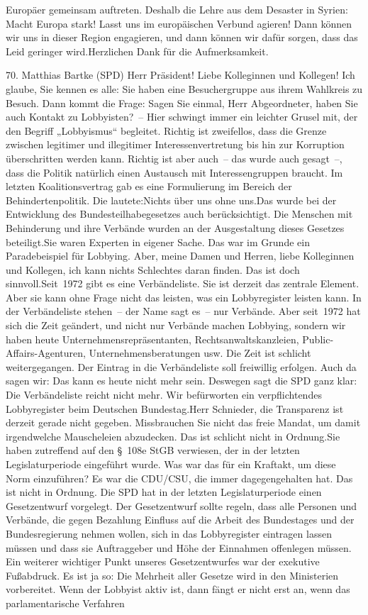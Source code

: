 \documentclass{article}
\begin{document}
Europäer gemeinsam auftreten. Deshalb die Lehre aus dem Desaster in Syrien: Macht Europa stark! Lasst uns im europäischen Verbund agieren! Dann können wir uns in dieser Region engagieren, und dann können wir dafür sorgen, dass das Leid geringer wird.Herzlichen Dank für die Aufmerksamkeit.




	70. Matthias Bartke (SPD) Herr Präsident! Liebe Kolleginnen und Kollegen! Ich glaube, Sie kennen es alle: Sie haben eine Besuchergruppe aus ihrem Wahlkreis zu Besuch. Dann kommt die Frage: Sagen Sie einmal, Herr Abgeordneter, haben Sie auch Kontakt zu Lobbyisten? – Hier schwingt immer ein leichter Grusel mit, der den Begriff „Lobbyismus“ begleitet. Richtig ist zweifellos, dass die Grenze zwischen legitimer und illegitimer Interessenvertretung bis hin zur Korruption überschritten werden kann. Richtig ist aber auch – das wurde auch gesagt –, dass die Politik natürlich einen Austausch mit Interessengruppen braucht. Im letzten Koalitionsvertrag gab es eine Formulierung im Bereich der Behindertenpolitik. Die lautete:Nichts über uns ohne uns.Das wurde bei der Entwicklung des Bundesteilhabegesetzes auch berücksichtigt. Die Menschen mit Behinderung und ihre Verbände wurden an der Ausgestaltung dieses Gesetzes beteiligt.Sie waren Experten in eigener Sache. Das war im Grunde ein Paradebeispiel für Lobbying. Aber, meine Damen und Herren, liebe Kolleginnen und Kollegen, ich kann nichts Schlechtes daran finden. Das ist doch sinnvoll.Seit 1972 gibt es eine Verbändeliste. Sie ist derzeit das zentrale Element. Aber sie kann ohne Frage nicht das leisten, was ein Lobbyregister leisten kann. In der Verbändeliste stehen – der Name sagt es – nur Verbände. Aber seit 1972 hat sich die Zeit geändert, und nicht nur Verbände machen Lobbying, sondern wir haben heute Unternehmensrepräsentanten, Rechtsanwaltskanzleien, Public-Affairs-Agenturen, Unternehmensberatungen usw. Die Zeit ist schlicht weitergegangen. Der Eintrag in die Verbändeliste soll freiwillig erfolgen. Auch da sagen wir: Das kann es heute nicht mehr sein. Deswegen sagt die SPD ganz klar: Die Verbändeliste reicht nicht mehr. Wir befürworten ein verpflichtendes Lobbyregister beim Deutschen Bundestag.Herr Schnieder, die Transparenz ist derzeit gerade nicht gegeben. Missbrauchen Sie nicht das freie Mandat, um damit irgendwelche Mauscheleien abzudecken. Das ist schlicht nicht in Ordnung.Sie haben zutreffend auf den § 108e StGB verwiesen, der in der letzten Legislaturperiode eingeführt wurde. Was war das für ein Kraftakt, um diese Norm einzuführen? Es war die CDU/CSU, die immer dagegengehalten hat. Das ist nicht in Ordnung. Die SPD hat in der letzten Legislaturperiode einen Gesetzentwurf vorgelegt. Der Gesetzentwurf sollte regeln, dass alle Personen und Verbände, die gegen Bezahlung Einfluss auf die Arbeit des Bundestages und der Bundesregierung nehmen wollen, sich in das Lobbyregister eintragen lassen müssen und dass sie Auftraggeber und Höhe der Einnahmen offenlegen müssen. Ein weiterer wichtiger Punkt unseres Gesetzentwurfes war der exekutive Fußabdruck. Es ist ja so: Die Mehrheit aller Gesetze wird in den Ministerien vorbereitet. Wenn der Lobbyist aktiv ist, dann fängt er nicht erst an, wenn das parlamentarische Verfahren 
\end{document}
